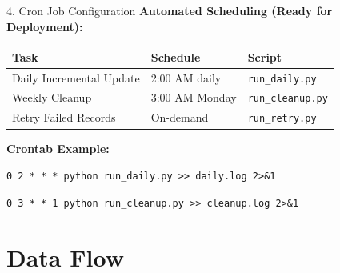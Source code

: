 \documentclass[aspectratio=169,10pt]{beamer}
\begin{document}
\begin{frame}{4. Cron Job Configuration}
    \textbf{Automated Scheduling (Ready for Deployment):}
    
    \vspace{0.5cm}
    
    \begin{table}[]
        \centering
        \begin{tabular}{lll}
            \toprule
            \textbf{Task} & \textbf{Schedule} & \textbf{Script} \\
            \midrule
            Daily Incremental Update & 2:00 AM daily & \texttt{run\_daily.py} \\
            Weekly Cleanup & 3:00 AM Monday & \texttt{run\_cleanup.py} \\
            Retry Failed Records & On-demand & \texttt{run\_retry.py} \\
            \bottomrule
        \end{tabular}
    \end{table}
    
    \vspace{0.5cm}
    
    \textbf{Crontab Example:}
    
    \vspace{0.2cm}
    
    {\small\texttt{0 2 * * * python run\_daily.py >> daily.log 2>\&1}}
    
    {\small\texttt{0 3 * * 1 python run\_cleanup.py >> cleanup.log 2>\&1}}
\end{frame}

\section{Data Flow}
\end{document}
